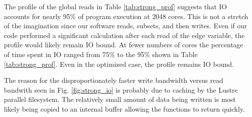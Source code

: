 The profile of the global reads in Table \ref{tab:strong_prof} suggests that IO accounts
for nearly 95\% of program execution at 2048 cores.  This is not a stretch of
the imagination since our software reads, subsets, and then writes.  Even if
our code performed a significant calculation after each read of the edge
variable, the profile would likely remain IO bound.  At fewer
numbers of cores the percentage of time spent in IO ranged from 75\% to the
95\% shown in Table \ref{tab:strong_prof}.  Even in the optimized case, the
profile remains IO bound.

The reason for the disproportionately faster write bandwidth versus read
bandwith seen in Fig. \ref{fig:strong_io} is probably due to caching by the
Lustre parallel filesystem.  The relatively small amount of data being written
is most likely being copied to an internal buffer allowing the functions to return
quickly.
